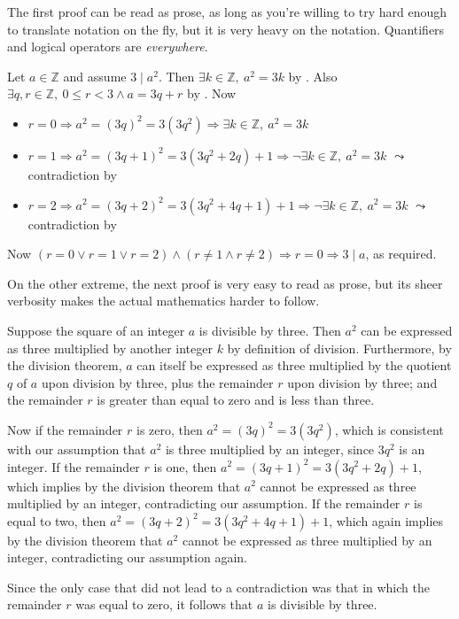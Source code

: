 The first proof can be read as prose, as long as you're willing to try hard enough to translate notation on the fly, but it is very heavy on the notation. Quantifiers and logical operators are \textit{everywhere}.

\begin{extract}
\label{xtrThreeDividesSquareImpliesThreeDividesOriginalTooMuchNotation}
Let $a \in \mathbb{Z}$ and assume $3 \mid a^2$. Then $\exists k \in \mathbb{Z},~a^2=3k$ by . Also $\exists q, r \in \mathbb{Z},~ 0 \le r < 3 \wedge a = 3q+r$ by . Now
\begin{itemize}
\item $r=0 \Rightarrow a^2=(3q)^2=3(3q^2) \Rightarrow \exists k \in \mathbb{Z},~a^2=3k$ \TT
\item $r=1 \Rightarrow a^2=(3q+1)^2=3(3q^2+2q)+1 \Rightarrow \neg \exists k \in \mathbb{Z},~a^2=3k$ $\leadsto$ contradiction by 
\item $r=2 \Rightarrow a^2=(3q+2)^2=3(3q^2+4q+1)+1 \Rightarrow \neg \exists k \in \mathbb{Z},~a^2=3k$ $\leadsto$ contradiction by 
\end{itemize}
Now $(r=0 \vee r=1 \vee r=2) \wedge (r \ne 1 \wedge r \ne 2) \Rightarrow r=0 \Rightarrow 3 \mid a$, as required.
\end{extract}

On the other extreme, the next proof is very easy to read as prose, but its sheer verbosity makes the actual mathematics harder to follow.

\begin{extract}
\label{xtrThreeDividesSquareImpliesThreeDividesOriginalTooLittleNotation}
Suppose the square of an integer $a$ is divisible by three. Then $a^2$ can be expressed as three multiplied by another integer $k$ by definition of division. Furthermore, by the division theorem, $a$ can itself be expressed as three multiplied by the quotient $q$ of $a$ upon division by three, plus the remainder $r$ upon division by three; and the remainder $r$ is greater than equal to zero and is less than three.

Now if the remainder $r$ is zero, then $a^2=(3q)^2=3(3q^2)$, which is consistent with our assumption that $a^2$ is three multiplied by an integer, since $3q^2$ is an integer. If the remainder $r$ is one, then $a^2=(3q+1)^2=3(3q^2+2q)+1$, which implies by the division theorem that $a^2$ cannot be expressed as three multiplied by an integer, contradicting our assumption. If the remainder $r$ is equal to two, then $a^2=(3q+2)^2=3(3q^2+4q+1)+1$, which again implies by the division theorem that $a^2$ cannot be expressed as three multiplied by an integer, contradicting our assumption again.

Since the only case that did not lead to a contradiction was that in which the remainder $r$ was equal to zero, it follows that $a$ is divisible by three.
\end{extract}

